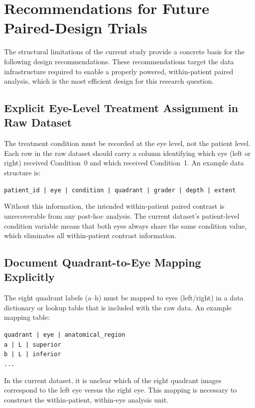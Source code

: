 \section{Recommendations for Future Paired-Design Trials}

The structural limitations of the current study provide a concrete basis for the following design recommendations. These recommendations target the data infrastructure required to enable a properly powered, within-patient paired analysis, which is the most efficient design for this research question.

\subsection{Explicit Eye-Level Treatment Assignment in Raw Dataset}

The treatment condition must be recorded at the eye level, not the patient level. Each row in the raw dataset should carry a column identifying which eye (left or right) received Condition~0 and which received Condition~1. An example data structure is:

\begin{center}
\texttt{patient\_id | eye | condition | quadrant | grader | depth | extent}
\end{center}

\noindent Without this information, the intended within-patient paired contrast is unrecoverable from any post-hoc analysis. The current dataset's patient-level condition variable means that both eyes always share the same condition value, which eliminates all within-patient contrast information.

\subsection{Document Quadrant-to-Eye Mapping Explicitly}

The eight quadrant labels (a--h) must be mapped to eyes (left/right) in a data dictionary or lookup table that is included with the raw data. An example mapping table:

\begin{center}
\texttt{quadrant | eye | anatomical\_region}\\
\texttt{a        | L   | superior}\\
\texttt{b        | L   | inferior}\\
\texttt{...}
\end{center}

\noindent In the current dataset, it is unclear which of the eight quadrant images correspond to the left eye versus the right eye. This mapping is necessary to construct the within-patient, within-eye analysis unit.

